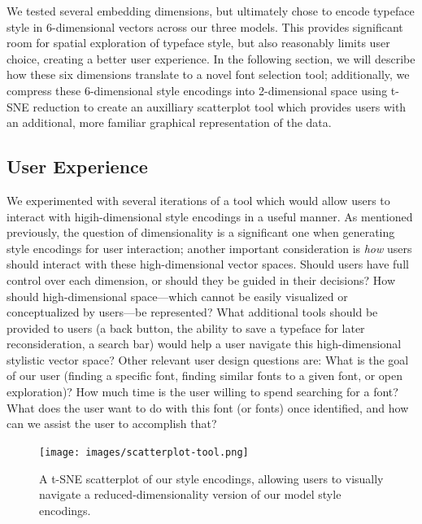 We tested several embedding dimensions, but ultimately chose to encode typeface style in 6-dimensional vectors across our three models. This provides significant room for spatial exploration of typeface style, but also reasonably limits user choice, creating a better user experience. In the following section, we will describe how these six dimensions translate to a novel font selection tool; additionally, we compress these 6-dimensional style encodings into 2-dimensional space using t-SNE reduction to create an auxilliary scatterplot tool which provides users with an additional, more familiar graphical representation of the data.

\subsection{User Experience}

We experimented with several iterations of a tool which would allow users to interact with higih-dimensional style encodings in a useful manner. As mentioned previously, the question of dimensionality is a significant one when generating style encodings for user interaction; another important consideration is \textit{how} users should interact with these high-dimensional vector spaces. Should users have full control over each dimension, or should they be guided in their decisions? How should high-dimensional space—which cannot be easily visualized or conceptualized by users—be represented? What additional tools should be provided to users (a back button, the ability to save a typeface for later reconsideration, a search bar) would help a user navigate this high-dimensional stylistic vector space? Other relevant user design questions are: What is the goal of our user (finding a specific font, finding similar fonts to a given font, or open exploration)? How much time is the user willing to spend searching for a font? What does the user want to do with this font (or fonts) once identified, and how can we assist the user to accomplish that?

\begin{figure}[h]
    \centering
    \texttt{[image: images/scatterplot-tool.png]}
    \caption{A t-SNE scatterplot of our style encodings, allowing users to visually navigate a reduced-dimensionality version of our model style encodings.}
    \label{fig:scatterplot-tool}
\end{figure}


